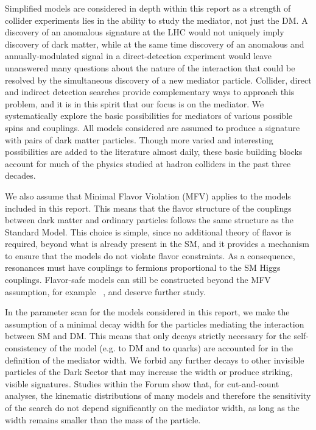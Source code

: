 Simplified models are considered in depth within this report as a strength of collider experiments lies in the ability to
study the mediator, not just the DM. A discovery of an
anomalous \MET signature
at the LHC would not uniquely imply discovery of dark matter, while at
the same time discovery of an anomalous and annually-modulated signal
in a direct-detection experiment would leave unanswered many questions
about the nature of the interaction that could be resolved by the simultaneous discovery
of a new mediator particle. 
Collider, direct and indirect detection searches provide complementary ways to
approach this problem, and it is in this spirit that our focus is on
the mediator. We systematically explore the basic possibilities for
mediators of various possible spins and couplings.
All models considered are assumed to produce a signature with pairs of dark matter particles.
Though more varied and
interesting possibilities are added to the literature almost daily,
these basic building blocks account for much of the physics studied at
hadron colliders in the past three decades.

We also assume that Minimal Flavor Violation (MFV) \cite{Chivukula:1987py,Hall:1990ac,Buras:2000dm,D'Ambrosio:2002ex} applies to the
models included in this report. This means that the flavor structure of the
couplings between dark matter and ordinary particles follows the same
structure as the Standard Model. This choice is simple, since no
additional theory of flavor is required, beyond what is already
present in the SM, and it provides a mechanism to ensure that the
models do not violate flavor constraints.  As a consequence, \spinzero
resonances must have couplings to fermions proportional to the SM Higgs couplings. 
Flavor-safe models can still be constructed beyond the MFV
assumption, for example ~\cite{Agrawal:2014aoa}, and deserve further study.

In the parameter scan for the models considered in this report, we make the
assumption of a minimal decay width for the particles mediating the
interaction between SM and DM.  This means that only decays
strictly necessary for the self-consistency of the model (e.g.  to DM
and to quarks) are accounted for in the definition of the mediator
width. We forbid any further decays to other invisible particles of
the Dark Sector that may increase the width or produce striking, visible signatures. 
Studies within the Forum
show that, for cut-and-count analyses, the kinematic distributions of
many models and therefore the sensitivity of the search do not depend
significantly on the mediator width, as long as the width remains smaller
than the mass of the particle.

